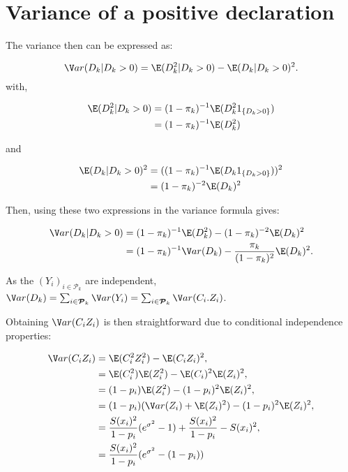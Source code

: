 \section{Variance of a positive declaration}

The variance then can be expressed as:

\[\V ar(D_k \vert D_k >0)  = \E(D_k^2 \vert D_k >0)- \E(D_k \vert D_k >0)^2.\]
with,

\begin{align*}
\E(D_k^2 \vert D_k >0) & = (1-\pi_k)^{-1} \E(D_k^2 1_{\left \lbrace D_k >0\right\rbrace}) \\
& = (1-\pi_k)^{-1} \E(D_k^2 )
\end{align*}

and

\begin{align*}
\E(D_k \vert D_k >0)^2 & = ((1-\pi_k)^{-1} \E(D_k 1_{\left \lbrace D_k >0\right\rbrace}))^2 \\
& =  (1-\pi_k)^{-2} \E(D_k)^2
\end{align*}

Then, using these two expressions in the variance formula gives:

\begin{align*}
\V ar(D_k \vert D_k >0) & = (1-\pi_k)^{-1} \E(D_k^2 ) - (1-\pi_k)^{-2} \E(D_k)^2 \\
& = (1-\pi_k)^{-1} \V ar(D_k) - \frac{\pi_k}{(1-\pi_k)^2} \E(D_k)^2.
\end{align*}

As the \((Y_{i})_{i \in \boldsymbol{\mathcal{P}}_k}\) are independent, \(\V ar(D_k) =\sum_{i \in \boldsymbol{\mathcal{P}}_k} \V ar(Y_{i}) = \sum_{i \in\boldsymbol{\mathcal{P}}_k} \V ar(C_{i}.Z_{i})\).

Obtaining \(\V ar(C_{i} Z_{i})\) is then straightforward due to conditional independence properties:

\begin{align*}
\V ar(C_{i} Z_{i}) & = \E( C_{i}^2 Z_{i}^2 ) - \E(C_{i} Z_{i})^2,\\
& =  \E( C_{i}^2) \E(Z_{i}^2 ) - \E(C_{i})^2 \E(Z_{i})^2,\\
& = (1-p_{i}) \E(Z_{i}^2 ) - (1-p_{i})^2 \E(Z_{i})^2,\\
& = (1-p_{i})(\V ar(Z_{i})+\E(Z_{i})^2)-(1-p_{i})^2 \E(Z_{i})^2,\\
& = \frac{S(x_{i})^2}{1-p_{i}}(e^{\sigma^2}-1)+\frac{S(x_{i})^2}{1-p_{i}}-S(x_{i})^2,\\
& = \frac{S(x_{i})^2}{1-p_{i}}(e^{\sigma^2}-(1-p_{i}))
\end{align*}

